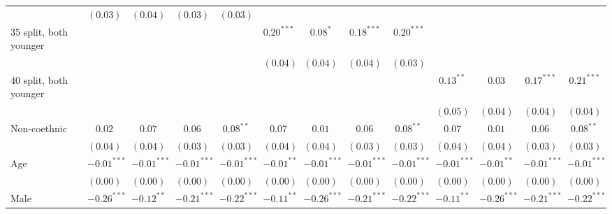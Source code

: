\begin{table}
\begin{center}
\begin{threeparttable}
\begin{tabular}{l c c c c c c c c c c c c}
                                & $(0.03)$      & $(0.04)$      & $(0.03)$      & $(0.03)$      &               &               &               &               &               &               &               &               \\
35 split, both younger          &               &               &               &               & $0.20^{***}$  & $0.08^{*}$    & $0.18^{***}$  & $0.20^{***}$  &               &               &               &               \\
                                &               &               &               &               & $(0.04)$      & $(0.04)$      & $(0.04)$      & $(0.03)$      &               &               &               &               \\
40 split, both younger          &               &               &               &               &               &               &               &               & $0.13^{**}$   & $0.03$        & $0.17^{***}$  & $0.21^{***}$  \\
                                &               &               &               &               &               &               &               &               & $(0.05)$      & $(0.04)$      & $(0.04)$      & $(0.04)$      \\
Non-coethnic                    & $0.02$        & $0.07$        & $0.06$        & $0.08^{**}$   & $0.07$        & $0.01$        & $0.06$        & $0.08^{**}$   & $0.07$        & $0.01$        & $0.06$        & $0.08^{**}$   \\
                                & $(0.04)$      & $(0.04)$      & $(0.03)$      & $(0.03)$      & $(0.04)$      & $(0.04)$      & $(0.03)$      & $(0.03)$      & $(0.04)$      & $(0.04)$      & $(0.03)$      & $(0.03)$      \\
Age                             & $-0.01^{***}$ & $-0.01^{***}$ & $-0.01^{***}$ & $-0.01^{***}$ & $-0.01^{**}$  & $-0.01^{***}$ & $-0.01^{***}$ & $-0.01^{***}$ & $-0.01^{***}$ & $-0.01^{**}$  & $-0.01^{***}$ & $-0.01^{***}$ \\
                                & $(0.00)$      & $(0.00)$      & $(0.00)$      & $(0.00)$      & $(0.00)$      & $(0.00)$      & $(0.00)$      & $(0.00)$      & $(0.00)$      & $(0.00)$      & $(0.00)$      & $(0.00)$      \\
Male                            & $-0.26^{***}$ & $-0.12^{**}$  & $-0.21^{***}$ & $-0.22^{***}$ & $-0.11^{**}$  & $-0.26^{***}$ & $-0.21^{***}$ & $-0.22^{***}$ & $-0.11^{**}$  & $-0.26^{***}$ & $-0.21^{***}$ & $-0.22^{***}$ \\

\end{tabular}
\end{threeparttable}
\end{center}
\end{table}
